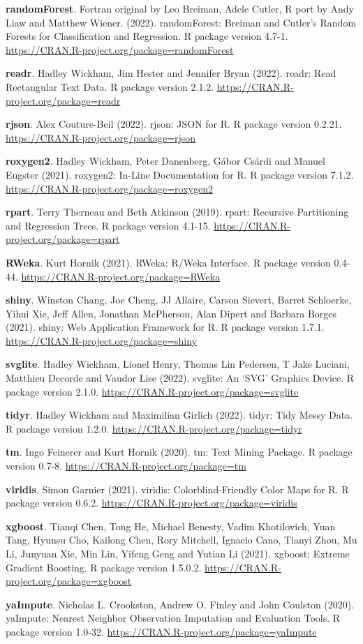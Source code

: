 \documentclass[
  11pt,
]{scrbook}
\begin{document}
\textbf{randomForest}. Fortran original by Leo Breiman, Adele Cutler, R port by Andy Liaw and Matthew Wiener. (2022). randomForest: Breiman and Cutler's Random Forests for Classification and
Regression. R package version 4.7-1. \url{https://CRAN.R-project.org/package=randomForest}

\textbf{readr}. Hadley Wickham, Jim Hester and Jennifer Bryan (2022). readr: Read Rectangular Text Data. R package version 2.1.2. \url{https://CRAN.R-project.org/package=readr}

\textbf{rjson}. Alex Couture-Beil (2022). rjson: JSON for R. R package version 0.2.21. \url{https://CRAN.R-project.org/package=rjson}

\textbf{roxygen2}. Hadley Wickham, Peter Danenberg, Gábor Csárdi and Manuel Eugster (2021). roxygen2: In-Line Documentation for R. R package version 7.1.2. \url{https://CRAN.R-project.org/package=roxygen2}

\textbf{rpart}. Terry Therneau and Beth Atkinson (2019). rpart: Recursive Partitioning and Regression Trees. R package version 4.1-15. \url{https://CRAN.R-project.org/package=rpart}

\textbf{RWeka}. Kurt Hornik (2021). RWeka: R/Weka Interface. R package version 0.4-44. \url{https://CRAN.R-project.org/package=RWeka}

\textbf{shiny}. Winston Chang, Joe Cheng, JJ Allaire, Carson Sievert, Barret Schloerke, Yihui Xie, Jeff Allen, Jonathan McPherson, Alan Dipert and Barbara Borges (2021). shiny: Web Application Framework for R. R package version 1.7.1. \url{https://CRAN.R-project.org/package=shiny}

\textbf{svglite}. Hadley Wickham, Lionel Henry, Thomas Lin Pedersen, T Jake Luciani, Matthieu Decorde and Vaudor Lise (2022). svglite: An `SVG' Graphics Device. R package version 2.1.0. \url{https://CRAN.R-project.org/package=svglite}

\textbf{tidyr}. Hadley Wickham and Maximilian Girlich (2022). tidyr: Tidy Messy Data. R package version 1.2.0. \url{https://CRAN.R-project.org/package=tidyr}

\textbf{tm}. Ingo Feinerer and Kurt Hornik (2020). tm: Text Mining Package. R package version 0.7-8. \url{https://CRAN.R-project.org/package=tm}

\textbf{viridis}. Simon Garnier (2021). viridis: Colorblind-Friendly Color Maps for R. R package version 0.6.2. \url{https://CRAN.R-project.org/package=viridis}

\textbf{xgboost}. Tianqi Chen, Tong He, Michael Benesty, Vadim Khotilovich, Yuan Tang, Hyunsu Cho, Kailong Chen, Rory Mitchell, Ignacio Cano, Tianyi Zhou, Mu Li, Junyuan Xie, Min Lin, Yifeng Geng and Yutian Li (2021). xgboost: Extreme Gradient Boosting. R package version 1.5.0.2. \url{https://CRAN.R-project.org/package=xgboost}

\textbf{yaImpute}. Nicholas L. Crookston, Andrew O. Finley and John Coulston (2020). yaImpute: Nearest Neighbor Observation Imputation and Evaluation Tools. R package version 1.0-32. \url{https://CRAN.R-project.org/package=yaImpute}

\printindex
\thispagestyle{empty}
\end{document}
